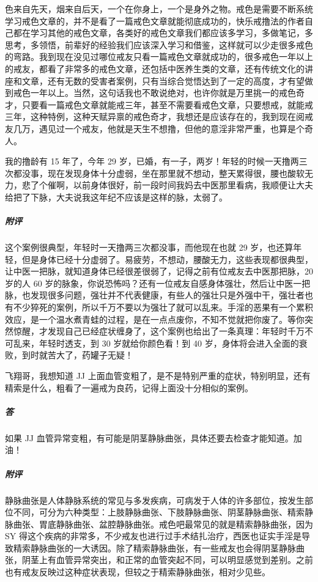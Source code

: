 \begin{case}
    色来自先天，烟来自后天，一个在你身上，一个是身外之物。戒色是需要不断系统学习戒色文章的，并不是看了一篇戒色文章就能彻底成功的，快乐戒撸法的作者自己都在学习其他的戒色文章，各类好的戒色文章我们都应该多学习，多做笔记，多思考，多领悟，前辈好的经验我们应该深入学习和借鉴，这样就可以少走很多戒色的弯路。我到现在没见过哪位戒友只看一篇戒色文章就成功的，很多戒色一年以上的戒友，都看了非常多的戒色文章，还包括中医养生类的文章，还有传统文化的讲座和文章，还有无数的受害者案例，只有当综合觉悟达到了一定的高度，才有望做到戒色一年以上。当然，这句话我也不敢说绝对，也许你就是万里挑一的戒色奇才，只要看一篇戒色文章就能戒三年，甚至不需要看戒色文章，只要想戒，就能戒三年，这种特例，这种天赋异禀的戒色奇才，我想还是应该存在的，我到现在阅戒友几万，遇见过一个戒友，他就是天生不想撸，但他的意淫非常严重，也算是个奇人。
\end{case}

\begin{case}
    我的撸龄有 15 年了，今年 29 岁，已婚，有一子，两岁！年轻的时候一天撸两三次都没事，现在发现身体十分虚弱，坐在那里就不想动，整天累得很，腰也酸软无力，悲了个催啊，以前身体很好，前一段时间我妈去中医那里看病，我顺便让大夫给把了下脉，大夫说我这年纪不应该是这样的脉，太弱了。
    \subparagraph{附评} 这个案例很典型，年轻时一天撸两三次都没事，而他现在也就 29 岁，也还算年轻，但是身体已经十分虚弱了。易疲劳，不想动，腰酸无力，这些表现都很典型，让中医一把脉，就知道身体已经很差很弱了，记得之前有位戒友去中医那把脉，20 岁的人 60 岁的脉象，你说恐怖吗？还有一位戒友自感身体强壮，然后让中医一把脉，也发现很多问题，强壮并不代表健康，有些人的强壮只是外强中干，强壮者也有不少猝死的案例，所以千万不要以为强壮了就可以乱来。手淫的恶果有一个累积效应，是一个温水煮青蛙的过程，是在一点点废你，不知不觉就把你废了。等你突然惊醒，才发现自己已经症状缠身了，这个案例也给出了一条真理：年轻时千万不可乱来，年轻时透支，到 30 岁就给你颜色看！到 40 岁，身体将会进入全面的衰败，到时就苦大了，药罐子无疑！
\end{case}

\begin{case}
    飞翔哥，我想知道 JJ 上面血管变粗了，是不是特别严重的症状，特别明显，还有精索是什么，粗看了一遍戒为良药，记得上面没十分相似的案例。
    \subparagraph{答} 如果 JJ 血管异常变粗，有可能是阴茎静脉曲张，具体还要去检查才能知道。加油！
    \subparagraph{附评} 静脉曲张是人体静脉系统的常见与多发疾病，可病发于人体的许多部位，按发生部位不同，可分为六种类型：上肢静脉曲张、下肢静脉曲张、阴茎静脉曲张、精索静脉曲张、胃底静脉曲张、盆腔静脉曲张。戒色吧最常见的就是精索静脉曲张，因为 SY 得这个疾病的非常多，不少戒友也进行过手术结扎治疗，西医也证实手淫是导致精索静脉曲张的一大诱因。除了精索静脉曲张，有一些戒友也会得阴茎静脉曲张，阴茎上有血管异常突出，和正常的血管突起不同，可以明显感觉到差别。之前也有戒友反映过这种症状表现，但较之于精索静脉曲张，相对少见些。
\end{case}

